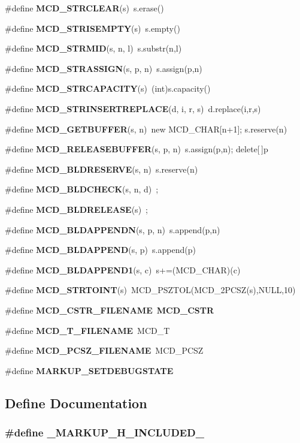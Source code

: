 \begin{CompactItemize}
\item 
\#define {\bf MCD\_\-STRCLEAR}(s)~s.erase()
\item 
\#define {\bf MCD\_\-STRISEMPTY}(s)~s.empty()
\item 
\#define {\bf MCD\_\-STRMID}(s, n, l)~s.substr(n,l)
\item 
\#define {\bf MCD\_\-STRASSIGN}(s, p, n)~s.assign(p,n)
\item 
\#define {\bf MCD\_\-STRCAPACITY}(s)~(int)s.capacity()
\item 
\#define {\bf MCD\_\-STRINSERTREPLACE}(d, i, r, s)~d.replace(i,r,s)
\item 
\#define {\bf MCD\_\-GETBUFFER}(s, n)~new MCD\_\-CHAR[n+1]; s.reserve(n)
\item 
\#define {\bf MCD\_\-RELEASEBUFFER}(s, p, n)~s.assign(p,n); delete[$\,$]p
\item 
\#define {\bf MCD\_\-BLDRESERVE}(s, n)~s.reserve(n)
\item 
\#define {\bf MCD\_\-BLDCHECK}(s, n, d)~;
\item 
\#define {\bf MCD\_\-BLDRELEASE}(s)~;
\item 
\#define {\bf MCD\_\-BLDAPPENDN}(s, p, n)~s.append(p,n)
\item 
\#define {\bf MCD\_\-BLDAPPEND}(s, p)~s.append(p)
\item 
\#define {\bf MCD\_\-BLDAPPEND1}(s, c)~s+=(MCD\_\-CHAR)(c)
\item 
\#define {\bf MCD\_\-STRTOINT}(s)~MCD\_\-PSZTOL(MCD\_\-2PCSZ(s),NULL,10)
\item 
\#define {\bf MCD\_\-CSTR\_\-FILENAME}~{\bf MCD\_\-CSTR}
\item 
\#define {\bf MCD\_\-T\_\-FILENAME}~MCD\_\-T
\item 
\#define {\bf MCD\_\-PCSZ\_\-FILENAME}~MCD\_\-PCSZ
\item 
\#define {\bf MARKUP\_\-SETDEBUGSTATE}
\end{CompactItemize}


\subsection{Define Documentation}
\subsubsection[\_\-MARKUP\_\-H\_\-INCLUDED\_\-]{\setlength{\rightskip}{0pt plus 5cm}\#define \_\-MARKUP\_\-H\_\-INCLUDED\_\-}\label{Markup_8h_964424c93c5bcf9f53d1bfb1f48dded8}


